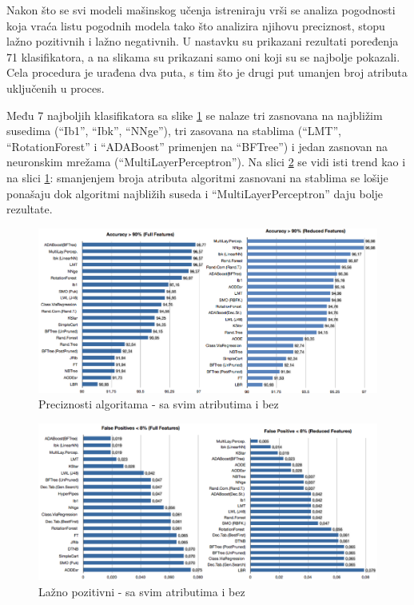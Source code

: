 \documentclass[a4paper]{article}
\theoremstyle{definition}
\begin{document}
{Nakon što se svi modeli mašinskog učenja istreniraju vrši se analiza pogodnosti
koja vraća listu pogodnih modela tako što analizira njihovu preciznost, stopu lažno pozitivnih i lažno negativnih.
U nastavku su prikazani rezultati poređenja 71 klasifikatora, a na slikama su prikazani samo oni koji su se najbolje pokazali. Cela procedura je urađena dva puta, s tim što je drugi put umanjen broj atributa uključenih u proces.

Među 7 najboljih klasifikatora sa slike \ref{fig:acc} se nalaze tri zasnovana na najbližim susedima (``Ib1'', ``Ibk'', ``NNge''), tri zasovana na stablima
(``LMT'', ``RotationForest'' i ``ADABoost'' primenjen na ``BFTree'') i jedan zasnovan na neuronskim mrežama (``MultiLayerPerceptron'').
Na slici  \ref{fig:falsePos} se vidi isti trend kao i na slici  \ref{fig:acc}: smanjenjem broja atributa algoritmi zasnovani na stablima se lošije ponašaju dok algoritmi najbližih suseda i ``MultiLayerPerceptron'' daju bolje rezultate.

\begin{figure}[h!]
\centering
\includegraphics[width=\textwidth]{accuracy.png}
\caption{Preciznosti algoritama - sa svim atributima i bez}
\label{fig:acc}
\end{figure}



\begin{figure}[h!]
\centering
\includegraphics[width=\textwidth]{false_positive.png}
\caption{Lažno pozitivni - sa svim atributima i bez}
\label{fig:falsePos}
\end{figure}

}
\end{document}
